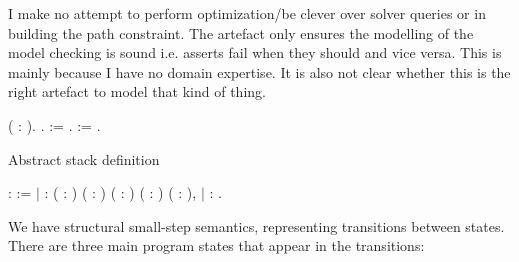 \documentclass[12pt]{report}
\begin{document}
      I make no attempt to perform optimization/be clever over solver
      queries or in building the path constraint. The artefact only ensures
      the modelling of the model checking is sound i.e. asserts fail when they
      should and vice versa. This is mainly because I have no domain expertise.
      It is also not clear whether this is the right artefact to model that
      kind of thing. 
\begin{coqdoccode}
\coqdocemptyline
\coqdocnoindent
{}  ( : ).\coqdoceol
\coqdocindent{1.00em}
  .\coqdoceol
\coqdocindent{1.00em}
  :=  .\coqdoceol
\coqdocindent{1.00em}
   :=  .\coqdoceol
\coqdocemptyline
\end{coqdoccode}
Abstract stack definition 
\begin{coqdoccode}
\coqdocemptyline
\coqdocindent{1.00em}
  :  :=\coqdoceol
\coqdocindent{2.00em}
\ensuremath{|} : \coqdoceol
\coqdocindent{4.00em}
\coqdockw{\ensuremath{\forall}} (   :      )\coqdoceol
\coqdocindent{7.50em}
(          :   )\coqdoceol
\coqdocindent{7.50em}
(      :       )\coqdoceol
\coqdocindent{7.50em}
(     :        )\coqdoceol
\coqdocindent{7.50em}
(             :      ),\coqdoceol
\coqdocindent{4.00em}
\coqdoceol
\coqdocindent{2.00em}
\ensuremath{|}  : .\coqdoceol
\coqdocemptyline
\end{coqdoccode}
We have structural small-step semantics, representing
        transitions between states. There are three main
        program states that appear in the transitions: 
\end{document}
